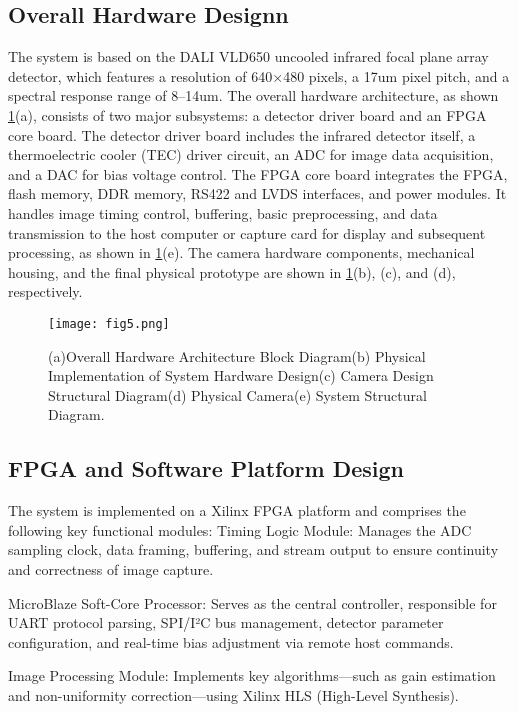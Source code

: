\documentclass[a4paper,fleqn]{cas-dc}
\begin{document}
\subsection{Overall Hardware Designn}
\label{subsec2}

The system is based on the DALI VLD650 uncooled infrared focal plane array detector, which features a resolution of 640×480 pixels, a 17um pixel pitch, and a spectral response range of 8–14um. The overall hardware architecture, as shown \cref{fig:fig5}(a), consists of two major subsystems: a detector driver board and an FPGA core board. The detector driver board includes the infrared detector itself, a thermoelectric cooler (TEC) driver circuit, an ADC for image data acquisition, and a DAC for bias voltage control. The FPGA core board integrates the FPGA, flash memory, DDR memory, RS422 and LVDS interfaces, and power modules. It handles image timing control, buffering, basic preprocessing, and data transmission to the host computer or capture card for display and subsequent processing, as shown in \cref{fig:fig5}(e). The camera hardware components, mechanical housing, and the final physical prototype are shown in \cref{fig:fig5}(b), (c), and (d), respectively.

 \begin{figure}[ht]
    \centering
    \texttt{[image: fig5.png]}
    \caption{(a)Overall Hardware Architecture Block Diagram(b) Physical Implementation of System Hardware Design(c) Camera Design Structural Diagram(d) Physical Camera(e) System Structural Diagram.}
    \label{fig:fig5}
\end{figure}

\subsection{FPGA and Software Platform Design}
\label{subsec2}

The system is implemented on a Xilinx FPGA platform and comprises the following key functional modules:
Timing Logic Module: Manages the ADC sampling clock, data framing, buffering, and stream output to ensure continuity and correctness of image capture.

MicroBlaze Soft-Core Processor: Serves as the central controller, responsible for UART protocol parsing, SPI/I²C bus management, detector parameter configuration, and real-time bias adjustment via remote host commands.

Image Processing Module: Implements key algorithms—such as gain estimation and non-uniformity correction—using Xilinx HLS (High-Level Synthesis).
\end{document}
